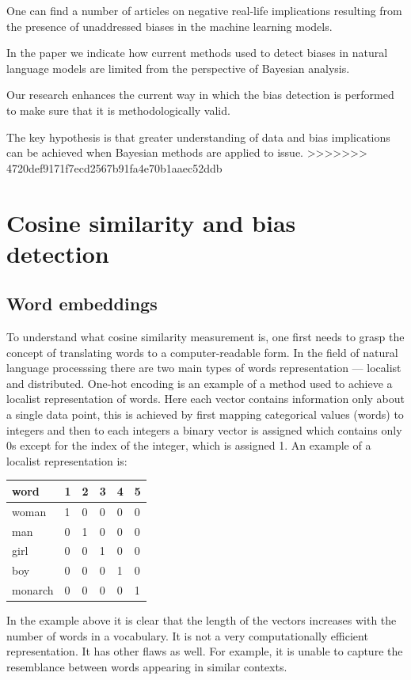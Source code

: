 \documentclass[12pt,]{book}
\begin{document}
One can find a number of articles on negative real-life implications
resulting from the presence of unaddressed biases in the machine
learning models.

In the paper we indicate how current methods used to detect biases in
natural language models are limited from the perspective of Bayesian
analysis.

Our research enhances the current way in which the bias detection is
performed to make sure that it is methodologically valid.

The key hypothesis is that greater understanding of data and bias
implications can be achieved when Bayesian methods are applied to issue.
>>>>>>> 4720def9171f7ecd2567b91fa4e70b1aaec52ddb

\chapter{Cosine similarity and bias
detection}\label{cosine-similarity-and-bias-detection}

\section{Word embeddings}\label{word-embeddings}

To understand what cosine similarity measurement is, one first needs to
grasp the concept of translating words to a computer-readable form. In
the field of natural language processsing there are two main types of
words representation --- localist and distributed. One-hot encoding is
an example of a method used to achieve a localist representation of
words. Here each vector contains information only about a single data
point, this is achieved by first mapping categorical values (words) to
integers and then to each integers a binary vector is assigned which
contains only 0s except for the index of the integer, which is assigned
1. An example of a localist representation is:

\begin{longtable}[]{@{}llllll@{}}
\toprule
word & 1 & 2 & 3 & 4 & 5\tabularnewline
\midrule
\endhead
woman & 1 & 0 & 0 & 0 & 0\tabularnewline
man & 0 & 1 & 0 & 0 & 0\tabularnewline
girl & 0 & 0 & 1 & 0 & 0\tabularnewline
boy & 0 & 0 & 0 & 1 & 0\tabularnewline
monarch & 0 & 0 & 0 & 0 & 1\tabularnewline
\bottomrule
\end{longtable}

In the example above it is clear that the length of the vectors
increases with the number of words in a vocabulary. It is not a very
computationally efficient representation. It has other flaws as well.
For example, it is unable to capture the resemblance between words
appearing in similar contexts.
\end{document}
